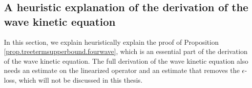 





\subsection{A heuristic explanation of the derivation of the wave kinetic equation}\label{sec.heuristic.fourwave} In this section, we explain heuristically explain the proof of Proposition \ref{prop.treetermsupperbound.fourwave}, which is an essential part of the derivation of the wave kinetic equation. The full derivation of the wave kinetic equation also needs an estimate on the linearized operator and an estimate that removes the $\epsilon$-loss, which will not be discussed in this thesis.



